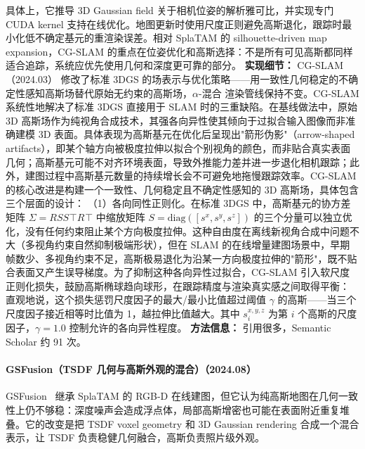 具体上，它推导 3D Gaussian field 关于相机位姿的解析雅可比，并实现专门 CUDA kernel 支持在线优化。地图更新时使用尺度正则避免高斯退化，跟踪时最小化低不确定基元的重渲染误差。相对 SplaTAM 的 silhouette-driven map expansion，CG-SLAM 的重点在位姿优化和高斯选择：不是所有可见高斯都同样适合追踪，系统应优先使用几何和深度更可靠的部分。
\textbf{实现细节：} CG-SLAM（2024.03） 修改了标准 3DGS 的场表示与优化策略——用一致性几何稳定的不确定性感知高斯场替代原始无约束的高斯场，$\alpha$-混合 渲染管线保持不变。CG-SLAM 系统性地解决了标准 3DGS 直接用于 SLAM 时的三重缺陷。在基线做法中，原始 3D 高斯场作为纯视角合成技术，其强各向异性使其倾向于过拟合输入图像而非准确建模 3D 表面。具体表现为高斯基元在优化后呈现出"箭形伪影"（arrow-shaped artifacts），即某个轴方向被极度拉伸以拟合个别视角的颜色，而非贴合真实表面几何；高斯基元可能不对齐环境表面，导致外推能力差并进一步退化相机跟踪；此外，建图过程中高斯基元数量的持续增长会不可避免地拖慢跟踪效率。CG-SLAM 的核心改进是构建一个一致性、几何稳定且不确定性感知的 3D 高斯场，具体包含三个层面的设计： （1）各向同性正则化。在标准 3DGS 中，高斯基元的协方差矩阵 $\Sigma = RSS^{}\top R^{}\top$ 中缩放矩阵 $S = \mathrm{diag}([s^x, s^y, s^z])$ 的三个分量可以独立优化，没有任何约束阻止某个方向极度拉伸。这种自由度在离线新视角合成中问题不大（多视角约束自然抑制极端形状），但在 SLAM 的在线增量建图场景中，早期帧数少、多视角约束不足，高斯极易退化为沿某一方向极度拉伸的"箭形"，既不贴合表面又产生误导梯度。为了抑制这种各向异性过拟合，CG-SLAM 引入软尺度正则化损失，鼓励高斯椭球趋向球形，在跟踪精度与渲染真实感之间取得平衡： 直观地说，这个损失惩罚尺度因子的最大/最小比值超过阈值 $\gamma$ 的高斯——当三个尺度因子接近相等时比值为 1，越拉伸比值越大。其中 $s_i^{x,y,z}$ 为第 $i$ 个高斯的尺度因子，$\gamma=1.0$ 控制允许的各向异性程度。
\textbf{方法信息：} 引用很多，Semantic Scholar 约 91 次。



\paragraph{GSFusion（TSDF 几何与高斯外观的混合）（2024.08）}
GSFusion~\cite{2408_12677} 继承 SplaTAM 的 RGB-D 在线建图，但它认为纯高斯地图在几何一致性上仍不够稳：深度噪声会造成浮点体，局部高斯增密也可能在表面附近重复堆叠。它的改变是把 TSDF voxel geometry 和 3D Gaussian rendering 合成一个混合表示，让 TSDF 负责稳健几何融合，高斯负责照片级外观。

